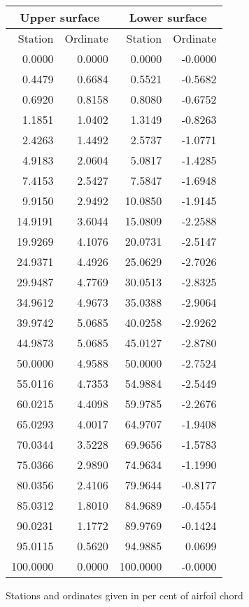 \documentclass[11pt]{book}
\begin{document}
 \hspace{4mm}
 \begin{tabular}{|r|r|r|r|} \hline 
 \multicolumn{2}{|c|}{Upper surface} & \multicolumn{2}{|c|}{Lower surface} \\
 \hline
 Station & Ordinate & Station & Ordinate \\
 \hline
0.0000 & 0.0000 & 0.0000 & -0.0000 \\
0.4479 & 0.6684 & 0.5521 & -0.5682 \\
0.6920 & 0.8158 & 0.8080 & -0.6752 \\
1.1851 & 1.0402 & 1.3149 & -0.8263 \\
2.4263 & 1.4492 & 2.5737 & -1.0771 \\
4.9183 & 2.0604 & 5.0817 & -1.4285 \\
7.4153 & 2.5427 & 7.5847 & -1.6948 \\
9.9150 & 2.9492 & 10.0850 & -1.9145 \\
14.9191 & 3.6044 & 15.0809 & -2.2588 \\
19.9269 & 4.1076 & 20.0731 & -2.5147 \\
24.9371 & 4.4926 & 25.0629 & -2.7026 \\
29.9487 & 4.7769 & 30.0513 & -2.8325 \\
34.9612 & 4.9673 & 35.0388 & -2.9064 \\
39.9742 & 5.0685 & 40.0258 & -2.9262 \\
44.9873 & 5.0685 & 45.0127 & -2.8780 \\
50.0000 & 4.9588 & 50.0000 & -2.7524 \\
55.0116 & 4.7353 & 54.9884 & -2.5449 \\
60.0215 & 4.4098 & 59.9785 & -2.2676 \\
65.0293 & 4.0017 & 64.9707 & -1.9408 \\
70.0344 & 3.5228 & 69.9656 & -1.5783 \\
75.0366 & 2.9890 & 74.9634 & -1.1990 \\
80.0356 & 2.4106 & 79.9644 & -0.8177 \\
85.0312 & 1.8010 & 84.9689 & -0.4554 \\
90.0231 & 1.1772 & 89.9769 & -0.1424 \\
95.0115 & 0.5620 & 94.9885 & 0.0699 \\
100.0000 & 0.0000 & 100.0000 & -0.0000 \\
 \hline 
 \end{tabular}
 \vspace{8mm}

Stations and ordinates given in per cent of airfoil chord
\end{document}
